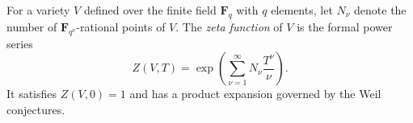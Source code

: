 For a variety $V$ defined over the finite field $\mathbf{F}_q$ with $q$ elements, let $N_\nu$ denote the number of $\mathbf{F}_{q^\nu}$-rational points of $V$. The \textit{zeta function} of $V$ is the formal power series
$$Z(V, T) = \exp\left( \sum_{\nu=1}^{\infty} N_\nu \frac{T^\nu}{\nu} \right).$$
It satisfies $Z(V, 0) = 1$ and has a product expansion governed by the Weil conjectures.

